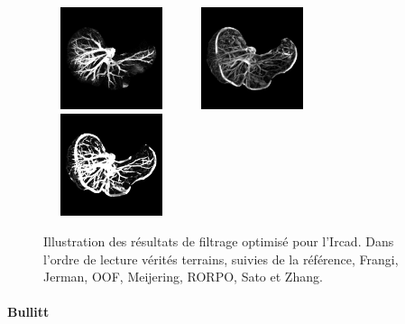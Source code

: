 \begin{figure}[!ht]
  \includegraphics[clip = true, trim  =  10 150 10 150, height=3cm,width=4cm]{Images/Ircad_RORPO.png}
  \includegraphics[clip = true, trim  =  10 150 10 150, height=3cm,width=4cm]{Images/Ircad_Sato.png}
  \includegraphics[clip = true, trim  =  10 150 10 150, height=3cm,width=4cm]{Images/Ircad_Zhang.png}
  \caption{Illustration des résultats de filtrage optimisé pour l'Ircad.
  Dans l'ordre de lecture vérités terrains, suivies de la référence, Frangi, Jerman, OOF, Meijering, RORPO, Sato et Zhang.}
  \label{fig:qualitative results Ircad}
\end{figure}

\paragraph{Bullitt}


